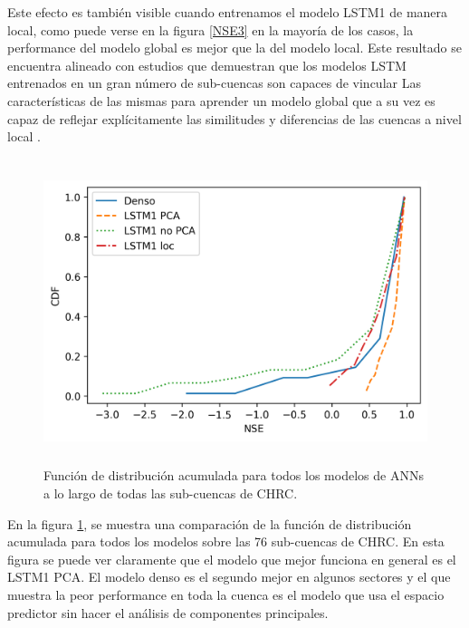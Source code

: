 
Este efecto es también visible cuando entrenamos el modelo LSTM1 de manera local,
como puede verse en la figura \ref{NSE3} en la mayoría de los casos, la performance del modelo global  es 
mejor que la del modelo local. Este resultado se encuentra alineado con estudios 
que demuestran que los modelos LSTM entrenados en un gran número de sub-cuencas son capaces de vincular Las
características de las mismas para aprender un modelo global que a su vez es capaz de reflejar  
explícitamente las similitudes y diferencias de las cuencas a nivel local  \cite{Kratzert}. 


\begin{figure}[h!]
  \begin{center}
    \includegraphics[height=3.5in]{Figures/NSE/CDF.png}
    \caption{ Función de distribución acumulada para todos los modelos de ANNs a lo largo de todas las sub-cuencas de CHRC.}
    \label{CDF}
  \end{center}
\end{figure}

En la figura \ref{CDF}, se muestra una comparación de la función de distribución acumulada para todos los modelos sobre las 76 sub-cuencas de CHRC.
En esta figura se puede ver claramente que el modelo que mejor funciona en general es el LSTM1 PCA. El modelo denso es el segundo mejor en algunos
sectores y el que muestra la peor performance en toda la cuenca es el modelo que usa el espacio predictor sin hacer el análisis de componentes principales.

